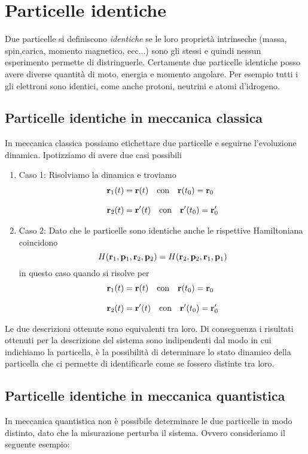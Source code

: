 \section{Particelle identiche }
Due particelle si definiscono \textit{identiche} se le loro propriet\`a intrinseche (massa, spin,carica, momento magnetico, ecc...) sono gli stessi e quindi nessun esperimento permette di distringuerle. Certamente due particelle identiche posso avere diverse quantit\`a di moto, energia e momento angolare. Per esempio tutti i gli elettroni sono identici, come anche protoni, neutrini e atomi d'idrogeno.

\subsection{Particelle identiche in meccanica classica }
In meccanica classica possiamo etichettare due particelle e seguirne l'evoluzione dinamica. Ipotizziamo di avere due casi possibili 
\begin{enumerate}
	\item Caso 1: Risolviamo la dinamica e troviamo
	\begin{align*}
		& \bold{r}_1(t) = \bold{r}(t) \quad \text{con} \quad \bold{r}(t_0) = \bold{r}_0 \\[0.3cm]
		& \bold{r}_2(t) = \bold{r}'(t) \quad \text{con} \quad \bold{r}'(t_0) = \bold{r}'_0
	\end{align*}
	\item Caso 2: Dato che le particelle sono identiche anche le rispettive Hamiltoniana coincidono
	\begin{equation*}
		H(\bold{r}_1,\bold{p}_1,\bold{r}_2,\bold{p}_2) = H(\bold{r}_2,\bold{p}_2,\bold{r}_1,\bold{p}_1)
	\end{equation*}
	in questo caso quando si risolve per 
	\begin{align*}
		& \bold{r}_1(t) = \bold{r}(t) \quad \text{con} \quad \bold{r}(t_0) = \bold{r}_0 \\[0.3cm]
		& \bold{r}_2(t) = \bold{r}'(t) \quad \text{con} \quad \bold{r}'(t_0) = \bold{r}'_0
	\end{align*}
\end{enumerate}
Le due descrizioni ottenute sono equivalenti tra loro. Di conseguenza i risultati ottenuti per la descrizione del sistema sono indipendenti dal modo in cui indichiamo la particella, \`e la possibilit\`a di determinare lo stato dinamico della particella che ci permette di identificarle come se fossero distinte tra loro.

\subsection{Particelle identiche in meccanica quantistica}
In meccanica quantistica non \`e possibile determinare le due particelle in modo distinto, dato che la misurazione perturba il sistema. Ovvero consideriamo il seguente esempio:

